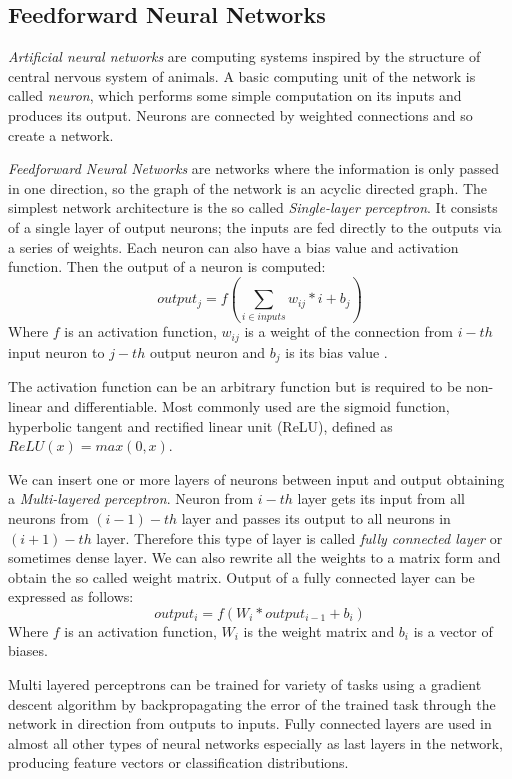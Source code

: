 \subsection{Feedforward Neural Networks}
\textit{Artificial neural networks} are computing systems inspired by the structure of central nervous system of animals. A basic computing unit of the network is called \textit{neuron}, which performs some simple computation on its inputs and produces its output. Neurons are connected by weighted connections and so create a network. \par
\textit{Feedforward Neural Networks} are networks where the information is only passed in one direction, so the graph of the network is an acyclic directed graph. The simplest network architecture is the so called \textit{Single-layer perceptron}. It consists of a single layer of output neurons; the inputs are fed directly to the outputs via a series of weights. Each neuron can also have a bias value and activation function. Then the output of a neuron is computed: $$output_j = f(\sum_{i \in inputs} {w_{ij}*i + b_j})$$ Where $f$ is an activation function, $w_{ij}$ is a weight of the connection from $i-th$ input neuron to $j-th$ output neuron and $b_j$ is its bias value .

The activation function can be an arbitrary function but is required to be non-linear and differentiable. Most commonly used are the sigmoid function, hyperbolic tangent and rectified linear unit (ReLU), defined as $ReLU(x) = max(0,x)$.\par  
We can insert one or more layers of neurons between input and output obtaining a \textit{Multi-layered perceptron}. Neuron from $i-th$ layer gets its input from all neurons from $(i-1)-th$ layer and passes its output to all neurons in $(i+1)-th$ layer. Therefore this type of layer is called \textit{fully connected layer} or sometimes dense layer.  We can also rewrite all the weights to a matrix form and obtain the so called weight matrix. Output of a fully connected layer can be expressed as follows: 
$$output_i = f(W_i * output_{i-1} + b_i)$$
Where $f$ is an activation function, $W_i$ is the weight matrix and $b_i$ is a vector of biases.\par  
Multi layered perceptrons can be trained for variety of tasks using a gradient descent algorithm by backpropagating the error of the trained task through the network in direction from outputs to inputs. Fully connected layers are used in almost all other types of neural networks especially as last layers in the network, producing feature vectors or classification distributions.

